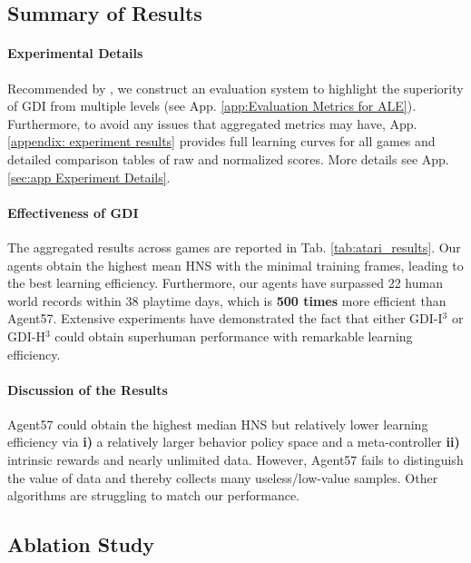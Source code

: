 \documentclass[nohyperref]{article}
\theoremstyle{plain}
\begin{document}
\subsection{Summary of Results}
\label{sec: Summary of Results}





\paragraph{Experimental Details} Recommended by \citep{agent57,atarihuman}, we construct an evaluation system to highlight the superiority of GDI from multiple levels (see App. \ref{app:Evaluation Metrics for ALE}). Furthermore, to avoid any issues that aggregated metrics may have, App. \ref{appendix: experiment results} provides full learning curves for all games and detailed comparison tables of raw and normalized scores. More details see App. \ref{sec:app Experiment Details}.

\paragraph{Effectiveness of GDI} The aggregated results across games are reported in Tab. \ref{tab:atari_results}. Our agents obtain the highest mean HNS with the minimal training frames, leading to the best learning efficiency. Furthermore, our agents have surpassed 22 human world records within  38 playtime days, which is \textbf{500 times} more efficient than Agent57. Extensive experiments have demonstrated the fact that either GDI-I$^3$ or GDI-H$^3$ could obtain  superhuman performance with remarkable learning efficiency. 


\paragraph{Discussion of the Results} Agent57 could obtain the highest median HNS but relatively lower learning efficiency via \textbf{i)} a relatively larger behavior policy space and  a meta-controller \textbf{ii)} intrinsic rewards and nearly unlimited data. However, Agent57 fails to distinguish the value of data and thereby collects many useless/low-value samples.  Other algorithms are struggling to match our performance.



\subsection{Ablation Study}
\end{document}
